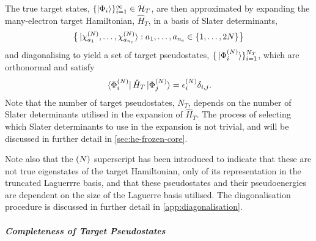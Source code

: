 \documentclass[draft]{article}
\begin{document}
The true target states,
$\lbrace\ket{\Phi_{i}}\rbrace_{i = 1}^{\infty} \in \mathcal{H}_{T}$, are then
approximated by expanding the many-electron target Hamiltonian, $\hat{H}_{T}$,
in a basis of Slater determinants,
\begin{equation}
  \label{eq:target-slater-determinant-basis}
  \lrset[\big]
  {
    \ket*
    {
      \chi_{a_{1}}^{\lr{N}},
      \dotsc,
      \chi_{a_{n_{\mathrm{e}}}}^{\lr{N}}
    }
    :
    a_{1}, \dotsc, a_{n_{\mathrm{e}}}
    \in
    \lrset{1, \dotsc, 2N}
  }
\end{equation}
and diagonalising to yield a set of target pseudostates,
$\lbrace\ket*{\Phi_{i}^{(N)}}\rbrace_{i = 1}^{N_{T}}$, which are orthonormal and
satisfy
\begin{equation}
  \label{eq:target-states}
  \bra*{\Phi_{i}^{\lr{N}}}
  \hat{H}_{T}
  \ket*{\Phi_{j}^{\lr{N}}}
  =
  \epsilon_{i}^{\lr{N}}
  \delta_{i, j}
  .
\end{equation}
Note that the number of target pseudostates, $N_{T}$, depends on the number of
Slater determinants utilised in the expansion of $\hat{H}_{T}$.
The process of selecting which Slater determinants to use in the expansion is
not trivial, and will be discussed in further detail in
\autoref{sec:he-frozen-core}.

Note also that the $(N)$ superscript has been introduced to indicate that
these are not true eigenstates of the target Hamiltonian, only of its
representation in the truncated Laguerrre basis, and that these pseudostates and
their pseudoenergies are dependent on the size of the Laguerre basis utilised.
The diagonalisation procedure is discussed in further detail in
\autoref{app:diagonalisation}.

\subparagraph{Completeness of Target Pseudostates}
\label{sec:target-states-completeness}
\end{document}
